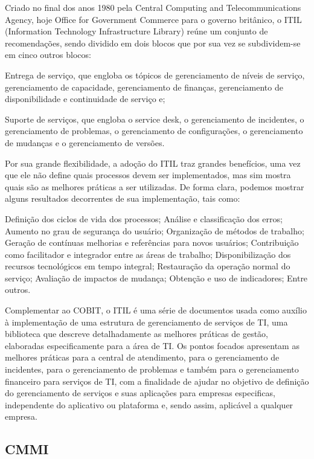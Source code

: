 	Criado no final dos anos 1980 pela Central Computing and Telecommunications Agency, hoje Office for Government Commerce para o governo britânico, o ITIL (Information Technology Infrastructure Library) reúne um conjunto de recomendações, sendo dividido em dois blocos que por sua vez se subdividem-se em cinco outros blocos:
 
Entrega de serviço, que engloba os tópicos de gerenciamento de níveis de serviço, gerenciamento de capacidade, gerenciamento de finanças, gerenciamento de disponibilidade e continuidade de serviço e;


Suporte de serviços, que engloba o service desk, o gerenciamento de incidentes, o gerenciamento de problemas, o gerenciamento de configurações, o gerenciamento de mudanças e o gerenciamento de versões.

	Por sua grande flexibilidade, a adoção do ITIL traz grandes benefícios, uma vez que ele não define quais processos devem ser implementados, mas sim mostra quais são as melhores práticas a ser utilizadas. De forma clara, podemos mostrar alguns resultados decorrentes de sua implementação, tais como:

Definição dos ciclos de vida dos processos;
Análise e classificação dos erros;
Aumento no grau de segurança do usuário;
Organização de métodos de trabalho;
Geração de contínuas melhorias e referências para novos usuários;
Contribuição como facilitador e integrador entre as áreas de trabalho;
Disponibilização dos recursos tecnológicos em tempo integral;
Restauração da operação normal do serviço;
Avaliação de impactos de mudança;
Obtenção e uso de indicadores;
Entre outros.

	Complementar ao COBIT, o ITIL é uma série de documentos usada como auxílio à implementação de uma estrutura de gerenciamento de serviços de TI, uma biblioteca que descreve detalhadamente as melhores práticas de gestão, elaboradas especificamente para a área de TI. Os pontos focados apresentam as melhores práticas para a central de atendimento, para o gerenciamento de incidentes, para o gerenciamento de problemas e também para o gerenciamento financeiro para serviços de TI, com a finalidade de ajudar no objetivo de definição do gerenciamento de serviços e suas aplicações para empresas especificas, independente do aplicativo ou plataforma e, sendo assim, aplicável a qualquer empresa.

\subsection{CMMI}


